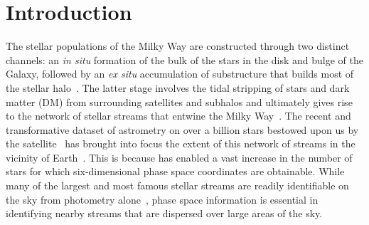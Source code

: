\documentclass[prd,10pt,twocolumn,showpacs,nofootinbib,aps,superscriptaddress,preprintnumbers]{revtex4-1}
\newcommand{\Gaia}{\!{\it Gaia}\xspace}
\begin{document}
 \maketitle


 \section{Introduction}

 The stellar populations of the Milky Way are constructed through two
 distinct channels: an \textit{in situ} formation of the bulk of the
 stars in the disk and bulge of the Galaxy, followed by an \textit{ex
   situ} accumulation of substructure that builds most of the stellar
 halo~\cite{Searle:1978gc,Freeman:2002wq}. The latter stage involves
 the tidal stripping of stars and dark matter (DM) from surrounding
 satellites and subhalos and ultimately gives rise to the network of
 stellar streams that entwine the Milky
 Way~\cite{Ibata:1994fv,Ibata:2000ys,Belokurov:2006,Belokurov:2006kc,Shipp:2018yce}. The
 recent and transformative dataset of astrometry on over a billion
 stars bestowed upon us by the \Gaia
 satellite~\cite{Brown:2016tnb,GaiaDR2,Gaia:2016} has brought into
 focus the extent of this network of streams in the vicinity of
 Earth~\cite{Myeong:2017skt,Myeong:Preprint,Lancaster:2018,Malhan:2018,Meingast:2019}. This is because \Gaia
 has enabled a vast increase in the number of stars for which
 six-dimensional phase space coordinates are obtainable. While many of
 the largest and most famous stellar streams are readily identifiable
 on the sky from photometry alone~\cite{Newberg:2016}, phase space
 information is essential in identifying nearby streams that are
 dispersed over large areas of the sky.
\end{document}

